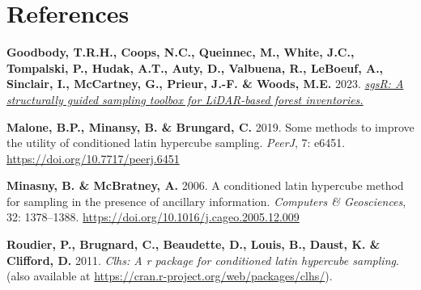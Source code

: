 \documentclass[
  10pt,
  b5paper,
  oneside]{book}
\newenvironment{Shaded}{\begin{snugshade}}{\end{snugshade}}
\newcommand{\AttributeTok}[1]{\textcolor[rgb]{0.77,0.63,0.00}{#1}}
\newcommand{\CommentTok}[1]{\textcolor[rgb]{0.56,0.35,0.01}{\textit{#1}}}
\newcommand{\ConstantTok}[1]{\textcolor[rgb]{0.00,0.00,0.00}{#1}}
\newcommand{\FunctionTok}[1]{\textcolor[rgb]{0.00,0.00,0.00}{#1}}
\newcommand{\NormalTok}[1]{#1}
\newcommand{\OtherTok}[1]{\textcolor[rgb]{0.56,0.35,0.01}{#1}}
\newcommand{\SpecialCharTok}[1]{\textcolor[rgb]{0.00,0.00,0.00}{#1}}
\newcommand{\StringTok}[1]{\textcolor[rgb]{0.31,0.60,0.02}{#1}}
\newlength{\cslhangindent}
\newlength{\cslentryspacingunit} %
\newenvironment{CSLReferences}[2] %
 {%
  \setlength{\parindent}{0pt}
  \ifodd #1
  \let\oldpar\par
  \def\par{\hangindent=\cslhangindent\oldpar}
  \fi
  \setlength{\parskip}{#2\cslentryspacingunit}
 }%
 {}
\begin{document}
\begin{Shaded}
\end{Shaded}

\hypertarget{references}{%
\chapter*{References}\label{references}}

\hypertarget{refs}{}
\begin{CSLReferences}{0}{0}
\leavevmode{}%
\textbf{Goodbody, T.R.H., Coops, N.C., Queinnec, M., White, J.C., Tompalski, P., Hudak, A.T., Auty, D., Valbuena, R., LeBoeuf, A., Sinclair, I., McCartney, G., Prieur, J.-F. \& Woods, M.E.} 2023. \emph{\href{https://doi.org/10.1093/forestry/cpac055}{sgsR: A structurally guided sampling toolbox for LiDAR-based forest inventories.}}

\leavevmode{}%
\textbf{Malone, B.P., Minansy, B. \& Brungard, C.} 2019. Some methods to improve the utility of conditioned latin hypercube sampling. \emph{PeerJ}, 7: e6451. \url{https://doi.org/10.7717/peerj.6451}

\leavevmode{}%
\textbf{Minasny, B. \& McBratney, A.} 2006. A conditioned latin hypercube method for sampling in the presence of ancillary information. \emph{Computers \& Geosciences}, 32: 1378--1388. \url{https://doi.org/10.1016/j.cageo.2005.12.009}

\leavevmode{}%
\textbf{Roudier, P., Brugnard, C., Beaudette, D., Louis, B., Daust, K. \& Clifford, D.} 2011. \emph{Clhs: A r package for conditioned latin hypercube sampling}. (also available at \url{https://cran.r-project.org/web/packages/clhs/}).

\end{CSLReferences}
\end{document}
